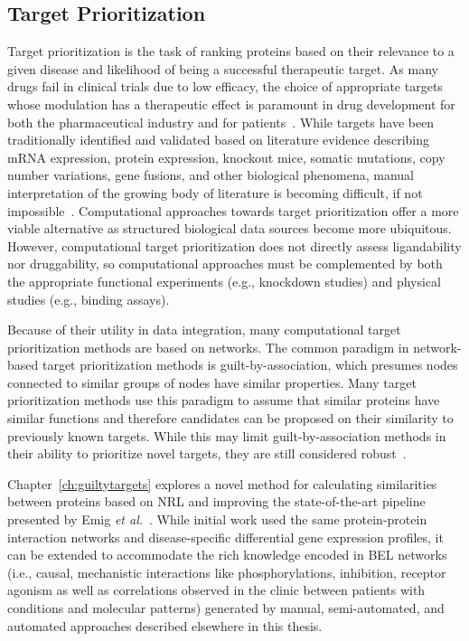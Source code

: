 \subsection{Target Prioritization}

Target prioritization is the task of ranking proteins based on their relevance to a given disease and likelihood of being a successful therapeutic target.
As many drugs fail in clinical trials due to low efficacy, the choice of appropriate targets whose modulation has a therapeutic effect is paramount in drug development for both the pharmaceutical industry and for patients~\cite{Arrowsmith2011,Arrowsmith2011a}.
While targets have been traditionally identified and validated based on literature evidence describing mRNA expression, protein expression, knockout mice, somatic mutations, copy number variations, gene fusions, and other biological phenomena, manual interpretation of the growing body of literature is becoming difficult, if not impossible~\cite{Gashaw2012,Isik2015,Moseley2007}.
Computational approaches towards target prioritization offer a more viable alternative as structured biological data sources become more ubiquitous.
However, computational target prioritization does not directly assess ligandability nor druggability, so computational approaches must be complemented by both the appropriate functional experiments (e.g., knockdown studies) and physical studies (e.g., binding assays).

Because of their utility in data integration, many computational target prioritization methods are based on networks.
The common paradigm in network-based target prioritization methods is guilt-by-association, which presumes nodes connected to similar groups of nodes have similar properties.
Many target prioritization methods use this paradigm to assume that similar proteins have similar functions and therefore candidates can be proposed on their similarity to previously known targets.
While this may limit guilt-by-association methods in their ability to prioritize novel targets, they are still considered robust~\cite{Moreau2012}.

Chapter~\ref{ch:guiltytargets} explores a novel method for calculating similarities between proteins based on \ac{NRL} and improving the state-of-the-art pipeline presented by Emig \textit{et al.}~\cite{Emig2013}.
While initial work used the same protein-protein interaction networks and disease-specific differential gene expression profiles, it can be extended to accommodate the rich knowledge encoded in \ac{BEL} networks (i.e., causal, mechanistic interactions like phosphorylations, inhibition, receptor agonism as well as correlations observed in the clinic between patients with conditions and molecular patterns) generated by manual, semi-automated, and automated approaches described elsewhere in this thesis.

